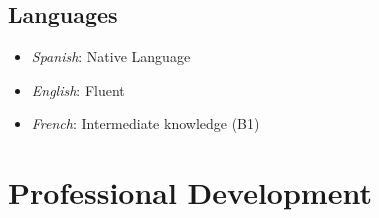 \documentclass[letterpaper,10pt]{article}
\begin{document}

\subsection*{Languages}


    \begin{multicols}{2}


\begin{itemize}[label=$\blacktriangleright$]
\item \emph{Spanish}: Native Language
\item \emph{English}: Fluent
\item \emph{French}: Intermediate knowledge (B1)
\end{itemize}

\end{multicols}


\section*{Professional Development}
\end{document}

